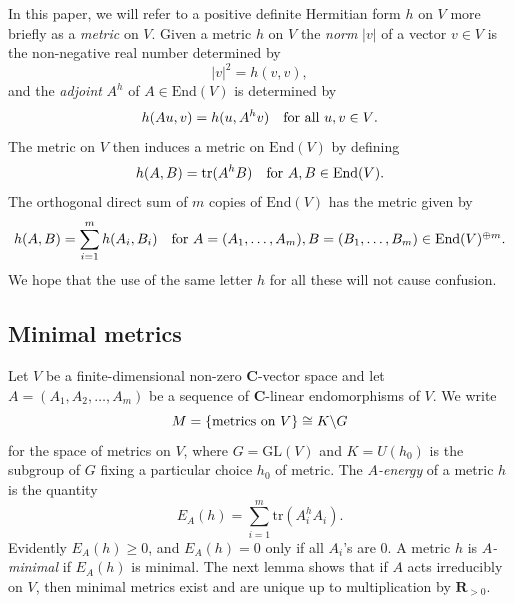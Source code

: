 \documentclass[12pt, reqno]{amsart}
\numberwithin{equation}{section}
\theoremstyle{definition}
\theoremstyle{plain}
\newcommand{\CC}{\mathbf{C}}
\newcommand{\RR}{\mathbf{R}}
\begin{document}
In this paper, we will refer to a positive definite Hermitian form $h$ on $V$ more briefly as a \emph{metric} on $V$. Given a metric $h$ on $V$ the \emph{norm} $|v|$ of a vector $v \in V$ is the non-negative real number determined by
$$|v|^2=h(v,v),$$ and the \emph{adjoint} $A^h$ of $A \in \mathrm{End}(V)$ is determined by
$$h(Au,v)=h(u,A^h v) \quad \hbox{for all $u,v \in V$.}$$ The metric on $V$ then induces a metric on $\mathrm{End}(V)$ by defining 
$$h(A,B)=\mathrm{tr}(A^h B) \quad \hbox{for $A,B \in \mathrm{End}(V)$.}$$ The orthogonal direct sum of $m$ copies of $\mathrm{End}(V)$ has the metric given by
$$h(A,B)=\sum_{i=1}^m h(A_i,B_i) \quad \hbox{for $A=(A_1,\dots,A_m), B=(B_1,\dots,B_m) \in \mathrm{End}(V)^{\oplus m}$.}$$ We hope that the use of the same letter $h$ for all these will not cause confusion.

\subsection{Minimal metrics}
Let $V$ be a finite-dimensional non-zero $\CC$-vector space and let $A=(A_1,A_2,\dots,A_m)$ be a sequence of $\CC$-linear endomorphisms of $V$. We write
$$M=\{ \hbox{metrics on $V$} \} \cong K \backslash G$$ for the space of metrics on $V$, where $G=\mathrm{GL}(V)$ and $K=U(h_0)$ is the subgroup of $G$ fixing a particular choice $h_0$ of metric. The \emph{$A$-energy} of a metric $h$ is the quantity
$$E_A(h)=\sum_{i=1}^m \mathrm{tr}(A_i^h A_i).$$ Evidently $E_A(h) \geq 0$, and $E_A(h)=0$ only if all $A_i$'s are $0$. A metric $h$ is \emph{$A$-minimal} if $E_A(h)$ is minimal. The next lemma shows that if $A$ acts irreducibly on $V$, then minimal metrics exist and are unique up to multiplication by $\RR_{>0}$.
\end{document}
